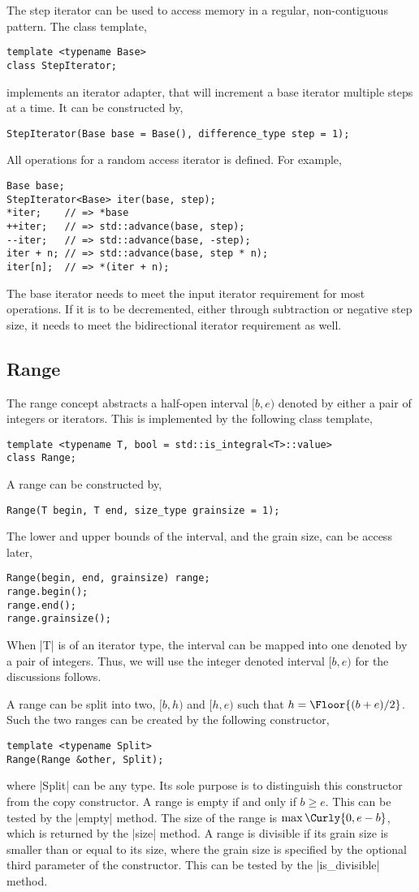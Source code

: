 The step iterator can be used to access memory in a regular, non-contiguous
pattern. The class template,
\begin{verbatim}
template <typename Base>
class StepIterator;
\end{verbatim}
implements an iterator adapter, that will increment a base iterator multiple
steps at a time. It can be constructed by,
\begin{verbatim}
StepIterator(Base base = Base(), difference_type step = 1);
\end{verbatim}
All operations for a random access iterator is defined. For example,
\begin{verbatim}
Base base;
StepIterator<Base> iter(base, step);
*iter;    // => *base
++iter;   // => std::advance(base, step);
--iter;   // => std::advance(base, -step);
iter + n; // => std::advance(base, step * n);
iter[n];  // => *(iter + n);
\end{verbatim}
The base iterator needs to meet the input iterator requirement for most
operations. If it is to be decremented, either through subtraction or negative
step size, it needs to meet the bidirectional iterator requirement as well.

\subsection{Range}
\label{sub:Range}

The range concept abstracts a half-open interval $[b, e)$ denoted by either a
pair of integers or iterators. This is implemented by the following class
template,
\begin{verbatim}
template <typename T, bool = std::is_integral<T>::value>
class Range;
\end{verbatim}
A range can be constructed by,
\begin{verbatim}
Range(T begin, T end, size_type grainsize = 1);
\end{verbatim}
The lower and upper bounds of the interval, and the grain size, can be access
later,
\begin{verbatim}
Range(begin, end, grainsize) range;
range.begin();
range.end();
range.grainsize();
\end{verbatim}
When |T| is of an iterator type, the interval can be mapped into one denoted by
a pair of integers. Thus, we will use the integer denoted interval $[b, e)$ for
the discussions follows.

A range can be split into two, $[b, h)$ and $[h, e)$ such that $h = \Floor{(b +
  e) / 2}$. Such the two ranges can be created by the following constructor,
\begin{verbatim}
template <typename Split>
Range(Range &other, Split);
\end{verbatim}
where |Split| can be any type. Its sole purpose is to distinguish this
constructor from the copy constructor. A range is empty if and only if $b \ge
e$. This can be tested by the |empty| method. The size of the range is
$\max\Curly{0, e - b}$, which is returned by the |size| method. A range is
divisible if its grain size is smaller than or equal to its size, where the
grain size is specified by the optional third parameter of the constructor.
This can be tested by the |is_divisible| method.

